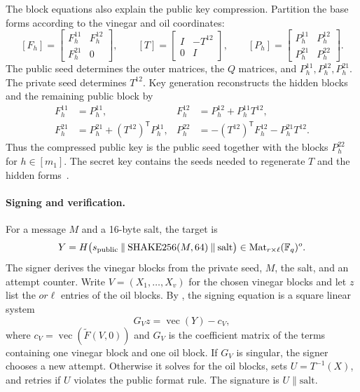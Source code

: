 \documentclass[11pt]{article}
\newcommand{\F}{\mathbb F}
\newcommand{\Mat}{\operatorname{Mat}}
\newcommand{\transpose}{\mathsf T}
\begin{document}
The block equations also explain the public key compression.  Partition the
base forms according to the vinegar and oil coordinates:
\[
 [F_h]=
 \begin{bmatrix}F_h^{11}&F_h^{12}\\F_h^{21}&0\end{bmatrix},
 \qquad
 [T]=
 \begin{bmatrix}I&-T^{12}\\0&I\end{bmatrix},
 \qquad
 [P_h]=
 \begin{bmatrix}P_h^{11}&P_h^{12}\\P_h^{21}&P_h^{22}\end{bmatrix}.
\]
The public seed determines the outer matrices, the $Q$ matrices, and
$P_h^{11},P_h^{12},P_h^{21}$.  The private seed determines $T^{12}$.  Key
generation reconstructs the hidden blocks and the remaining public block by
\begin{equation}
 \begin{aligned}
  F_h^{11}&=P_h^{11},
  &F_h^{12}&=P_h^{12}+P_h^{11}T^{12},\\
  F_h^{21}&=P_h^{21}+(T^{12})^\transpose P_h^{11},
  &P_h^{22}&=-(T^{12})^\transpose F_h^{12}-P_h^{21}T^{12}.
 \end{aligned}
 \label{eq:scheme-keygen-blocks}
\end{equation}
Thus the compressed public key is the public seed together with the blocks
$P_h^{22}$ for $h\in[m_1]$.  The secret key contains the seeds needed to
regenerate $T$ and the hidden forms~\cite{SNOVA23}.

\paragraph{Signing and verification.}
For a message $M$ and a 16-byte salt, the target is
\begin{equation}
 Y=H\bigl(s_{\rm public}\mathbin\|\operatorname{SHAKE256}(M,64)
          \mathbin\|\mathrm{salt}\bigr)
 \in\Mat_{r\times\ell}(\F_q)^o.
 \label{eq:scheme-target}
\end{equation}
The signer derives the vinegar blocks from the private seed, $M$, the salt,
and an attempt counter.  Write $V=(X_1,\ldots,X_v)$ for the chosen vinegar
blocks and let $z$ list the $or\ell$ entries of the oil blocks.  By
, the signing equation is a square linear system
\begin{equation}
 G_Vz=\operatorname{vec}(Y)-c_V,
 \label{eq:scheme-signing-system}
\end{equation}
where $c_V=\operatorname{vec}(\widetilde F(V,0))$ and $G_V$ is the coefficient
matrix of the terms containing one vinegar block and one oil block.  If $G_V$
is singular, the signer chooses a new attempt.  Otherwise it solves for the
oil blocks, sets $U=T^{-1}(X)$, and retries if $U$ violates the public format
rule.  The signature is $U\mathbin\|\mathrm{salt}$.
\end{document}
